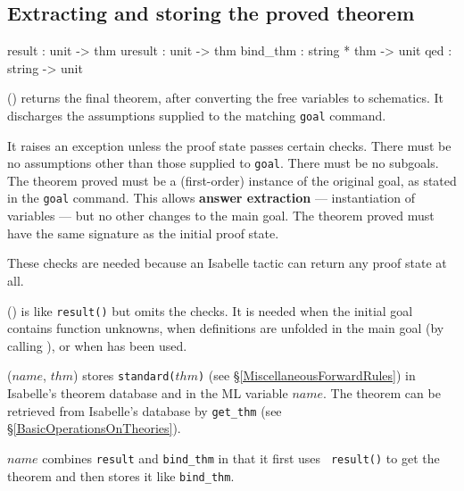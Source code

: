 \subsection{Extracting and storing the proved theorem}
\label{ExtractingAndStoringTheProvedTheorem}
\begin{ttbox} 
result    : unit -> thm
uresult   : unit -> thm
bind_thm  : string * thm -> unit
qed       : string -> unit
\end{ttbox}
\begin{ttdescription}
\item[\ttindexbold{result}()]
  returns the final theorem, after converting the free variables to
  schematics.  It discharges the assumptions supplied to the matching 
  {\tt goal} command.  

  It raises an exception unless the proof state passes certain checks.  There
  must be no assumptions other than those supplied to {\tt goal}.  There
  must be no subgoals.  The theorem proved must be a (first-order) instance
  of the original goal, as stated in the {\tt goal} command.  This allows
  {\bf answer extraction} --- instantiation of variables --- but no other
  changes to the main goal.  The theorem proved must have the same signature
  as the initial proof state.

  These checks are needed because an Isabelle tactic can return any proof
  state at all.

\item[\ttindexbold{uresult}()] is like {\tt result()} but omits the checks.
  It is needed when the initial goal contains function unknowns, when
  definitions are unfolded in the main goal (by calling
  ), or when
   has been used.

\item[\ttindexbold{bind_thm}($name$, $thm$)]
  stores {\tt standard($thm$)} (see \S\ref{MiscellaneousForwardRules})
  in Isabelle's theorem database and in the ML variable $name$. The
  theorem can be retrieved from Isabelle's database by {\tt get_thm}
  (see \S\ref{BasicOperationsOnTheories}).

\item[\ttindexbold{qed} $name$]
  combines {\tt result} and {\tt bind_thm} in that it first uses {\tt
  result()} to get the theorem and then stores it like {\tt bind_thm}.
\end{ttdescription}


